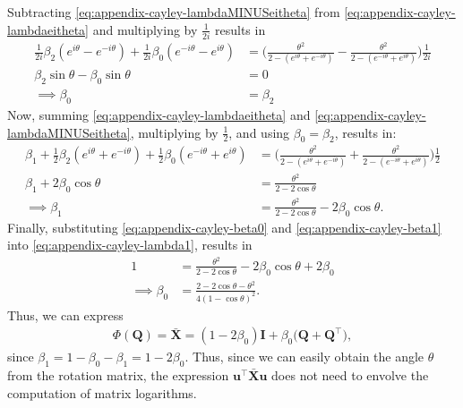Subtracting \eqref{eq:appendix-cayley-lambdaMINUSeitheta} from \eqref{eq:appendix-cayley-lambdaeitheta} and multiplying by $\frac{1}{2i}$ results in
\begin{align}
    \frac{1}{2i}\beta_2(e^{i\theta}-e^{-i\theta}) +\frac{1}{2i}\beta_0(e^{-i\theta}-e^{i\theta}) &= \biggl(\frac{\theta^2}{2 - (e^{i\theta}+ e^{-i\theta})} - \frac{\theta^2}{2 - (e^{-i\theta}+ e^{i\theta})}\biggr)\frac{1}{2i}\\
    \beta_2\sin\theta -\beta_0\sin\theta &= 0\\
    \implies \beta_0&=\beta_2 \label{eq:appendix-cayley-beta0}
\end{align}
Now, summing \eqref{eq:appendix-cayley-lambdaeitheta} and \eqref{eq:appendix-cayley-lambdaMINUSeitheta}, multiplying by $\frac{1}{2}$, and using $\beta_0=\beta_2$, results in:
\begin{align}
    \beta_1+\frac{1}{2}\beta_2(e^{i\theta}+e^{-i\theta}) +\frac{1}{2}\beta_0(e^{-i\theta}+e^{i\theta}) &= \biggl(\frac{\theta^2}{2 - (e^{i\theta}+ e^{-i\theta})} + \frac{\theta^2}{2 - (e^{-i\theta}+ e^{i\theta})}\biggr)\frac{1}{2}\\
    \beta_1+2\beta_0\cos\theta  &= \frac{\theta^2}{2 - 2\cos\theta}\\
    \implies \beta_1&=\frac{\theta^2}{2 - 2\cos\theta} - 2\beta_0\cos\theta. \label{eq:appendix-cayley-beta1}
\end{align}
Finally, substituting \eqref{eq:appendix-cayley-beta0} and \eqref{eq:appendix-cayley-beta1} into \eqref{eq:appendix-cayley-lambda1}, results in
\begin{align}
    1 &= \frac{\theta^2}{2 - 2\cos\theta} - 2\beta_0\cos\theta + 2\beta_0 \\
    \implies \beta_0 &= \frac{2-2\cos\theta-\theta^2}{4(1 - \cos\theta)^2}. 
\end{align}
Thus, we can express
\begin{align}
    \Phi(\mathbf{Q}) = \bar{\mathbf{X}} = (1-2\beta_0)\mathbf{I} + \beta_0\bigl(\mathbf{Q} + \mathbf{Q}^\top\bigr), \label{eq:appendix-explicit-X-bar-eedist}
\end{align}
since $\beta_1=1-\beta_0-\beta_1=1-2\beta_0$. Thus, since we can easily obtain the angle $\theta$ from the rotation matrix, the expression $\mathbf{u}^\top\bar{\mathbf{X}}\mathbf{u}$ does not need to envolve the computation of matrix logarithms.

